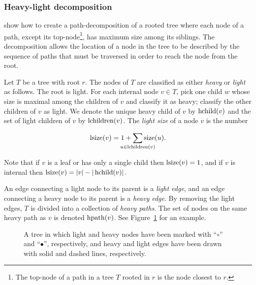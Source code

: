 \subsubsection{Heavy-light decomposition}\label{tec:heavylight}
 show how to create a path-decomposition of a rooted tree where each node of a path, except its top-node\footnote{The top-node of a path in a tree $T$ rooted in $r$ is the node closest to $r$.}, has maximum size among its siblings. 
The decomposition allows the location of a node in the tree to be described by the sequence of paths that must be traversed in order to reach the node from the root. 

Let $T$ be a tree with root $r$. The nodes of $T$ are classified as either \emph{heavy} or \emph{light} as follows. The root is light. For each internal node $v\in T$, pick one child $w$ whose size is maximal among the children of $v$ and classify it as heavy; classify the other children of $v$ as light.  We denote the unique heavy child of $v$ by $\operatorname{hchild}(v)$ and the set of light children of $v$ by $\operatorname{lchildren}(v)$. The \emph{light size} of a node $v$ is the number 

$$ \lsize(v) =  1+\sum_{\mathclap{u\in \lchildren(v)}} \size(u).$$

Note that if $v$ is a leaf or has only a single child then
$\operatorname{lsize}(v)=1$, and if $v$ is internal then 
$\operatorname{lsize}(v)=\vert v \vert - \vert \operatorname{hchild}(v) \vert$.

An edge connecting a light node to its parent is a \emph{light edge}, and an edge connecting a heavy node to its parent is a \emph{heavy edge}. By removing the light edges, $T$ is divided into a collection of \emph{heavy paths}. The set of nodes on the same heavy path as $v$ is denoted $\operatorname{hpath}(v)$.  See Figure~\ref{fig:heavylighttree} for an example.
\begin{figure}
\centering
{}
\caption{
A tree in which light and heavy nodes have been marked with ``$\circ$'' and ``$\bullet$'', respectively, and heavy and light edges have been drawn with solid and dashed lines, respectively.} \label{fig:heavylighttree}
\end{figure}

